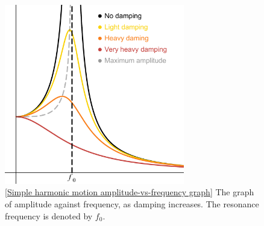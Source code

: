 \documentclass[oneside]{book}
\begin{document}
\begin{figure}[p]
    \centering
    \includegraphics[width=0.7\textwidth]{../images/SHM/Amplitude-vs-frequency-graph.pdf}
    \caption{\ref{Simple harmonic motion amplitude-vs-frequency graph} The graph of amplitude against frequency, as damping increases. The resonance frequency is denoted by \(f_0\).}
    \label{fig:SHM-graphs-A-f}
\end{figure}
\end{document}
